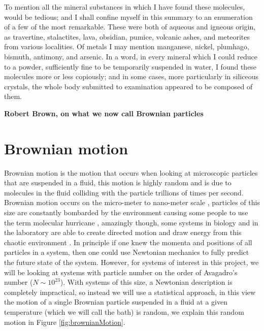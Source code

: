 \epigraph{
To mention all the mineral substances in which I have found these molecules, would be tedious; and I shall confine myself in this summary to an enumeration of a few of the most remarkable. These were both of aqueous and igneous origin, as travertine, stalactites, lava, obsidian, pumice, volcanic ashes, and meteorites from various localities. Of metals I may mention manganese, nickel, plumhago, bismuth, antimony, and arsenic. In a word, in every mineral which I could reduce to a powder, sufficiently fine to be temporarily suspended in water, I found these molecules more or less copiously; and in some cases, more particularly in siliceous crystals, the whole body submitted to examination appeared to be composed of them.}{\textbf{Robert Brown, on what we now call Brownian particles}}

\section{Brownian motion}
Brownian motion is the motion that occurs when looking at microscopic particles that are suspended in a fluid, this motion is highly random and is due to molecules in the fluid colliding with the particle trillions of times per second. Brownian motion occurs on the micro-meter to nano-meter scale \cite{KellerBustamante2000,Reimann2001}, particles of this size are constantly bombarded by the environment causing some people to use the term molecular hurricane \cite{Astumian2007}, amazingly though, some systems in biology and in the laboratory are able to create directed motion and draw energy from this chaotic environment \cite{Reimann2001}. In principle if one knew the momenta and positions of all particles in a system, then one could use Newtonian mechanics to fully predict the future state of the system. However, for systems of interest in this project, we will be looking at systems with particle number on the order of Avagadro's number ($N \sim 10^{23}$). With systems of this size, a Newtonian description is completely impractical, so instead we will use a statistical approach, in this view the motion of a single Brownian particle suspended in a fluid at a given temperature (which we will call the bath) is random, we explain this random motion in Figure \ref{fig:brownianMotion}.

